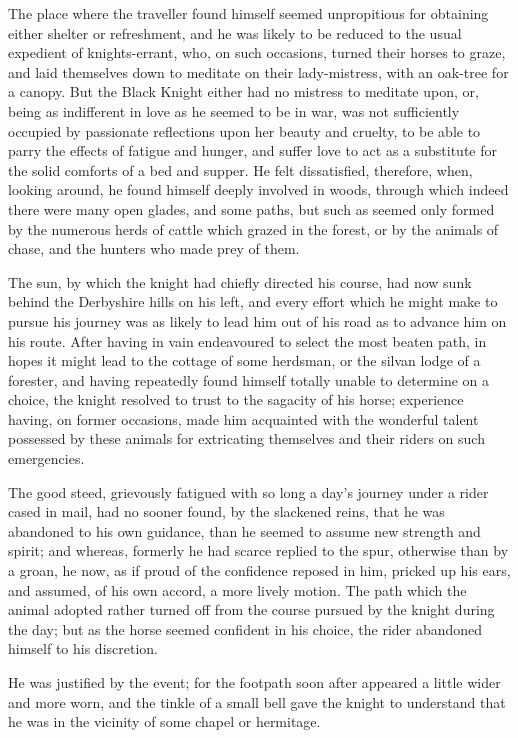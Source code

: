 The place where the traveller found himself seemed unpropitious for
obtaining either shelter or refreshment, and he was likely to be reduced
to the usual expedient of knights-errant, who, on such occasions, turned
their horses to graze, and laid themselves down to meditate on their
lady-mistress, with an oak-tree for a canopy. But the Black Knight
either had no mistress to meditate upon, or, being as indifferent in
love as he seemed to be in war, was not sufficiently occupied by
passionate reflections upon her beauty and cruelty, to be able to parry
the effects of fatigue and hunger, and suffer love to act as a
substitute for the solid comforts of a bed and supper. He felt
dissatisfied, therefore, when, looking around, he found himself deeply
involved in woods, through which indeed there were many open glades, and
some paths, but such as seemed only formed by the numerous herds of
cattle which grazed in the forest, or by the animals of chase, and the
hunters who made prey of them.

The sun, by which the knight had chiefly directed his course, had now
sunk behind the Derbyshire hills on his left, and every effort which he
might make to pursue his journey was as likely to lead him out of his
road as to advance him on his route. After having in vain endeavoured to
select the most beaten path, in hopes it might lead to the cottage of
some herdsman, or the silvan lodge of a forester, and having repeatedly
found himself totally unable to determine on a choice, the knight
resolved to trust to the sagacity of his horse; experience having, on
former occasions, made him acquainted with the wonderful talent
possessed by these animals for extricating themselves and their riders
on such emergencies.

The good steed, grievously fatigued with so long a day's journey under a
rider cased in mail, had no sooner found, by the slackened reins, that
he was abandoned to his own guidance, than he seemed to assume new
strength and spirit; and whereas, formerly he had scarce replied to the
spur, otherwise than by a groan, he now, as if proud of the confidence
reposed in him, pricked up his ears, and assumed, of his own accord, a
more lively motion. The path which the animal adopted rather turned off
from the course pursued by the knight during the day; but as the horse
seemed confident in his choice, the rider abandoned himself to his
discretion.

He was justified by the event; for the footpath soon after appeared a
little wider and more worn, and the tinkle of a small bell gave the
knight to understand that he was in the vicinity of some chapel or
hermitage.

